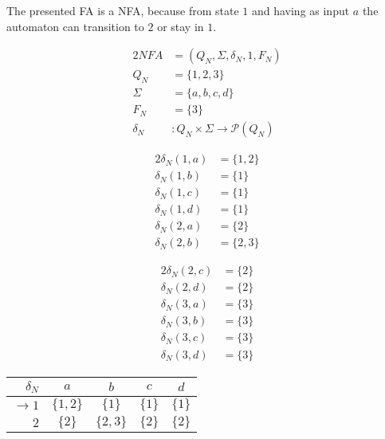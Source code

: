 \documentclass[docid=PA03]{tcom_PA}
\begin{document}
\setcounter{chapter}{2}
{
\renewcommand{\thesubsection}{\thesection.\alph{subsection}}
The presented FA is a NFA, because from state $1$ and having as input $a$ the automaton can transition to $2$ or stay in $1$.
\begin{center}
\begin{minipage}[c]{0.30\textwidth}
	\begin{alignat*}{2}
		NFA    &= (Q_N, \Sigma, \delta_N, 1, F_N)\\
		Q_N    &= \{1,2,3\}\\
		\Sigma &= \{a,b,c,d\}\\
		F_N    &= \{3\}\\
		\delta_N &\colon Q_N \times \Sigma \rightarrow \mathscr{P}(Q_N)
	\end{alignat*}
\end{minipage}%
\begin{minipage}[c]{0.30\textwidth}
	\begin{alignat*}{2}
		\delta_N(1,a) &= \{1,2\}\\
		\delta_N(1,b) &= \{1\}\\
		\delta_N(1,c) &= \{1\}\\
		\delta_N(1,d) &= \{1\}\\
		\delta_N(2,a) &= \{2\}\\
		\delta_N(2,b) &= \{2,3\}
	\end{alignat*}
\end{minipage}%
\begin{minipage}[c]{0.30\textwidth}
	\begin{alignat*}{2}
		\delta_N(2,c) &= \{2\}\\
		\delta_N(2,d) &= \{2\}\\
		\delta_N(3,a) &= \{3\}\\
		\delta_N(3,b) &= \{3\}\\
		\delta_N(3,c) &= \{3\}\\
		\delta_N(3,d) &= \{3\}
	\end{alignat*}
\end{minipage}
\end{center}
\begin{center}
\begin{tabular}{r | c c c c}
	$     \delta_N$ & $a      $ & $b      $ & $c    $ & $d    $ \\ \hline
	$\rightarrow 1$ & $\{1,2\}$ & $\{1\}  $ & $\{1\}$ & $\{1\}$ \\
	$            2$ & $\{2\}  $ & $\{2,3\}$ & $\{2\}$ & $\{2\}$ \\

\end{tabular}
\end{center}}
\end{document}
